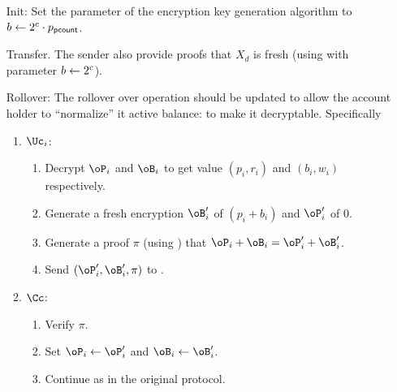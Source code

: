 \begin{enumerate}
	
	\item[Init:] Set the parameter of the encryption key generation algorithm to  $b \leftarrow 2^{c}\cdot p_{\mathsf{pcount}}$.
	 
	\item[Transfer.]  The sender also provide proofs that $X_d$ is fresh (\ie using \pZK{\rFsh} with parameter $b\leftarrow 2^c$).
	
	
	\item[Rollover:] The rollover over operation should be updated to allow the account holder to ``normalize''  it active balance: to make it decryptable. Specifically
	
	\begin{enumerate}
		\item $\Uc_i$:
		
		\begin{enumerate}
			\item Decrypt $\oP_i$ and $\oB_i$ to get value $(p_i,r_i)$ and $(b_i,w_i)$ respectively.
			
			
			\item Generate a fresh  encryption $\oB_i'$ of $(p_i +b_i )$ and $\oP_i'$ of $0$.
			
			\item Generate a proof $\pi$ (\ie using \pZK{\rEq})   that $\oP_i+\oB_i = \oP_i'+ \oB_i'$.
			
			\item Send $(\oP_i',\oB_i',\pi)$ to \Cc.
		
		\end{enumerate}
		
		\item $\Cc$:
			\begin{enumerate}
				\item Verify $\pi$.
				
				\item Set $\oP_i  \asn \oP_i'$  and $\oB_i  \asn \oB_i'$.
				
				\item Continue as in the original protocol.
			\end{enumerate}
		
	\end{enumerate}
\end{enumerate}